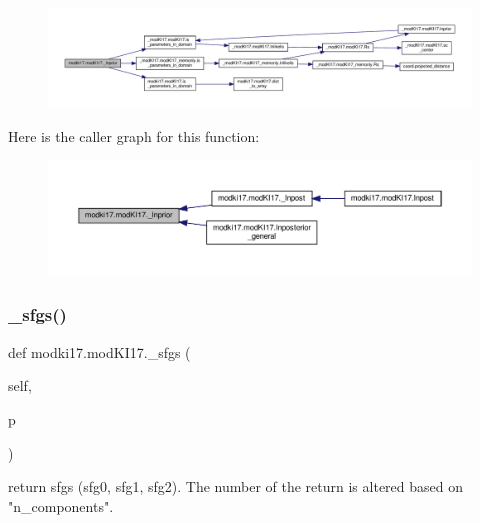 \begin{figure}[H]
\begin{center}
\leavevmode
\includegraphics[width=350pt]{df/da3/classmodki17_1_1modKI17_afbd9170967100bb7fefe8cef8cfcd520_cgraph}
\end{center}
\end{figure}
Here is the caller graph for this function\+:\nopagebreak
\begin{figure}[H]
\begin{center}
\leavevmode
\includegraphics[width=350pt]{df/da3/classmodki17_1_1modKI17_afbd9170967100bb7fefe8cef8cfcd520_icgraph}
\end{center}
\end{figure}
\mbox{\label{classmodki17_1_1modKI17_a23a8694e674a462a35cebe0d7ddc00fb}} 
\subsubsection{\texorpdfstring{\+\_\+sfgs()}{\_sfgs()}}
{\footnotesize\ttfamily def modki17.\+mod\+K\+I17.\+\_\+sfgs (\begin{DoxyParamCaption}\item[{}]{self,  }\item[{}]{p }\end{DoxyParamCaption})\hspace{0.3cm}{\ttfamily [private]}}

\begin{DoxyVerb}return sfgs (sfg0, sfg1, sfg2).
The number of the return is altered based on "n_components".
\end{DoxyVerb}
 

